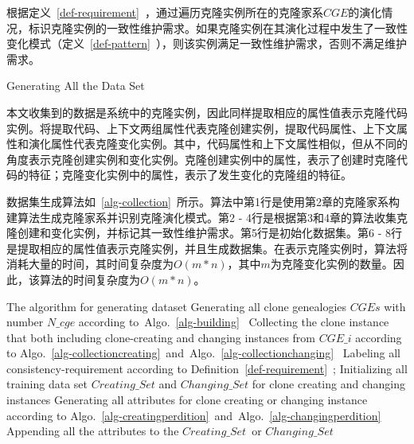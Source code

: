 根据定义~\ref{def-requirement}~，通过遍历克隆实例所在的克隆家系$CGE$的演化情况，标识克隆实例的一致性维护需求。如果克隆实例在其演化过程中发生了一致性变化模式（定义~\ref{def-pattern}~），则该实例满足一致性维护需求，否则不满足维护需求。

{Generating All the Data Set}

本文收集到的数据是系统中的克隆实例，因此同样提取相应的属性值表示克隆代码实例。将提取代码、上下文两组属性代表克隆创建实例，提取代码属性、上下文属性和演化属性代表克隆变化实例。其中，代码属性和上下文属性相似，但从不同的角度表示克隆创建实例和变化实例。克隆创建实例中的属性，表示了创建时克隆代码的特征；克隆变化实例中的属性，表示了发生变化的克隆组的特征。

数据集生成算法如~\ref{alg-collection}~所示。算法中第1行是使用第2章的克隆家系构建算法生成克隆家系并识别克隆演化模式。第2 - 4行是根据第3和4章的算法收集克隆创建和变化实例，并标记其一致性维护需求。第5行是初始化数据集。第6 - 8行是提取相应的属性值表示克隆实例，并且生成数据集。在表示克隆实例时，算法将消耗大量的时间，其时间复杂度为$O(m*n)$，其中$m$为克隆变化实例的数量。因此，该算法的时间复杂度为$O(m*n)$。

\vspace{1em}
\begin{minipage}{0.8\textwidth}
\centering
\begin{algorithm}[H]
 {The algorithm for generating dataset}
\label{alg-collection}
Generating all clone genealogies $CGEs$ with number $N\_cge$ according to~Algo.~\ref{alg-building}~\;
{ 
 Collecting the clone instance that both including clone-creating and changing instances from $CGE\_i$ according to Algo.~\ref{alg-collectioncreating}~and~Algo.~\ref{alg-collectionchanging}~\; 
 Labeling all consistency-requirement according to Definition~\ref{def-requirement}~;
}
Initializing all training data set $Creating\_Set$ and $Changing\_Set$ for clone creating and changing instances\; 
{ 
Generating all attributes for clone creating or changing instance according to Algo.~\ref{alg-creatingperdition}~and~Algo.~\ref{alg-changingperdition}~\;
Appending all the attributes to the $Creating\_Set$\ or $Changing\_Set$\;
}
\end{algorithm}
\end{minipage}
\vspace{1em}

